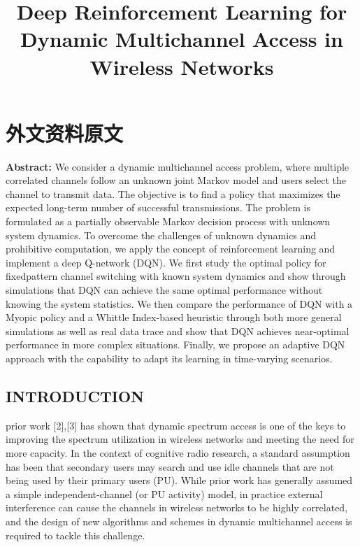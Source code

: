 \chapter{外文资料原文}
\label{cha:engorg}

\title{Deep Reinforcement Learning for Dynamic Multichannel Access in Wireless Networks }

\textbf{Abstract:} We consider a dynamic multichannel access problem, where multiple correlated channels follow an unknown joint Markov model and users select the channel to transmit data. The objective is to ﬁnd a policy that maximizes the expected long-term number of successful transmissions. The problem is formulated as a partially observable Markov decision process with unknown system dynamics. To overcome the challenges of unknown dynamics and prohibitive computation, we apply the concept of reinforcement learning and implement a deep Q-network (DQN). We ﬁrst study the optimal policy for ﬁxedpattern channel switching with known system dynamics and show through simulations that DQN can achieve the same optimal performance without knowing the system statistics. We then compare the performance of DQN with a Myopic policy and a Whittle Index-based heuristic through both more general simulations as well as real data trace and show that DQN achieves near-optimal performance in more complex situations. Finally, we propose an adaptive DQN approach with the capability to adapt its learning in time-varying scenarios. 


\section*{ INTRODUCTION }
prior work [2],[3] has shown that dynamic spectrum access is one of the keys to improving the spectrum utilization in wireless networks and meeting the need for more capacity. In the context of cognitive radio research, a standard assumption has been that secondary users may search and use idle channels that are not being used by their primary users (PU). While prior work has generally assumed a simple independent-channel (or PU activity) model, in practice external interference can cause the channels in wireless networks to be highly correlated, and the design of new algorithms and schemes in dynamic multichannel access is required to tackle this challenge.


